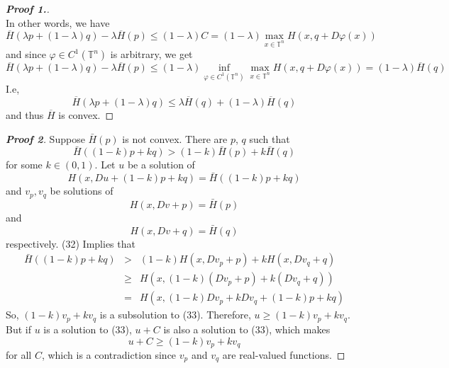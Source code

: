 \documentclass[12pt, oneside]{amsart}  	%
\begin{document}
\begin{proof}[\textbf{Proof 1.}]
\begin{equation*}
\end{equation*}
In other words, we have
\begin{equation*}
\overline{H}\left(\lambda p + (1-\lambda)q\right) - \lambda \overline{H}(p) \leq  (1-\lambda)C = (1-\lambda)\max_{x\in \mathbb{T}^n} H(x,q+D\varphi(x))
\end{equation*}
and since $\varphi\in C^1(\mathbb{T}^n)$ is arbitrary, we get
\begin{equation*}
\overline{H}\left(\lambda p + (1-\lambda)q\right) - \lambda \overline{H}(p)  \leq  (1-\lambda) \inf_{\varphi\in C^1(\mathbb{T}^n)} \max_{x\in \mathbb{T}^n} H(x,q+D\varphi(x)) = (1-\lambda)\overline{H}(q)
\end{equation*}
I.e,
\begin{equation*}
\overline{H}\left(\lambda p + (1-\lambda)q\right)  \leq \lambda \overline{H}(q) + (1-\lambda)\overline{H}(q)
\end{equation*}
and thus $\overline{H}$ is convex.
\end{proof}

\begin{proof}[\textbf{Proof 2}]
Suppose $\bar{H}(p)$ is not convex.  There are $p$, $q$ such that 
	\begin{equation}
		\bar{H}((1-k)p + kq) > (1-k)\bar{H}(p)+k\bar{H}(q)
	\end{equation}
	for some $k\in (0,1)$. Let $u$ be a solution of
	\begin{equation}
		H(x, Du + (1-k)p + kq) = \bar{H}((1-k)p + kq)
	\end{equation}
	and $v_p, v_q$ be solutions of
	$$H(x,Dv + p)= \bar{H}(p)$$
	and $$H(x,Dv + q)= \bar{H}(q)$$
	respectively.
	(32) Implies that 
	\begin{eqnarray*}
		\bar{H}((1-k)p + kq)	&>& 	(1-k)H(x,Dv_p + p)+ kH(x,Dv_q + q)\\
						&\ge&	H(x, (1-k)(Dv_p + p) + k(Dv_q +q)) \\
						&=&		H(x, (1-k)Dv_p+ kDv_q + (1-k)p +kq)
	\end{eqnarray*}
	So, $(1-k)v_p + kv_q$ is a subsolution to (33). Therefore, $u \ge (1-k)v_p + kv_q$. But if $u$ is a solution to (33), $u+C$ is also a solution to (33), which makes
	$$ u + C \ge (1-k)v_p + kv_q$$ for all $C$, which is a contradiction since $v_p$ and $v_q$ are real-valued functions.
\end{proof}

\nocite{*}


\end{document}
